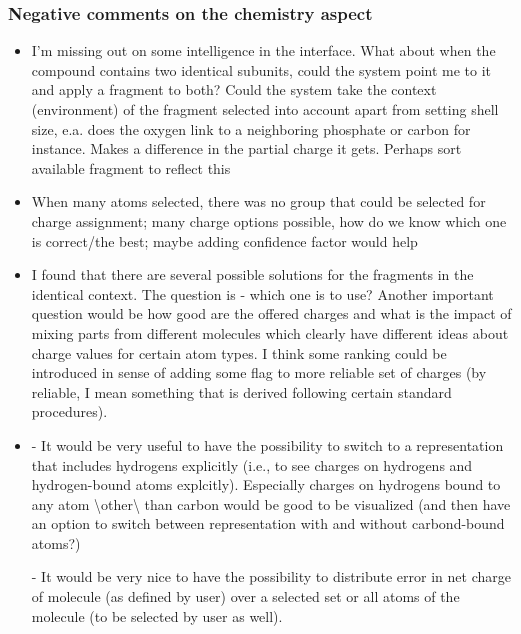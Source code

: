 \subsubsection{Negative comments on the chemistry aspect}
\begin{itemize}
\item I'm missing out on some intelligence in the interface. What about when the compound contains two identical subunits, could the system point me to it and apply a fragment to both? Could the system take the context (environment) of the fragment selected into account apart from setting shell size, e.a. does the oxygen link to a neighboring phosphate or carbon for instance. Makes a difference in the partial charge it gets. Perhaps sort available fragment to reflect this

\item When many atoms selected, there was no group that could be selected for charge assignment; many charge options possible, how do we know which one is correct/the best; maybe adding confidence factor would help

\item I found that there are several possible solutions for the fragments in the identical context. The question is - which one is to use? Another important question would be how good are the offered charges and what is the impact of mixing parts from different molecules which clearly have different ideas about charge values for certain atom types. I think some ranking could be introduced in sense of adding some flag to more reliable set of charges (by reliable, I mean something that is derived following certain standard procedures).

\item - It would be very useful to have the possibility to switch to a representation that includes hydrogens explicitly (i.e., to see charges on hydrogens and hydrogen-bound atoms explcitly). Especially charges on hydrogens bound to any atom {\textbackslash}other{\textbackslash} than carbon would be good to be visualized (and then have an option to switch between representation with and without carbond-bound atoms?)


- It would be very nice to have the possibility to distribute error in net charge of molecule (as defined by user) over a selected set or all atoms of the molecule (to be selected by user as well).

\end{itemize}


